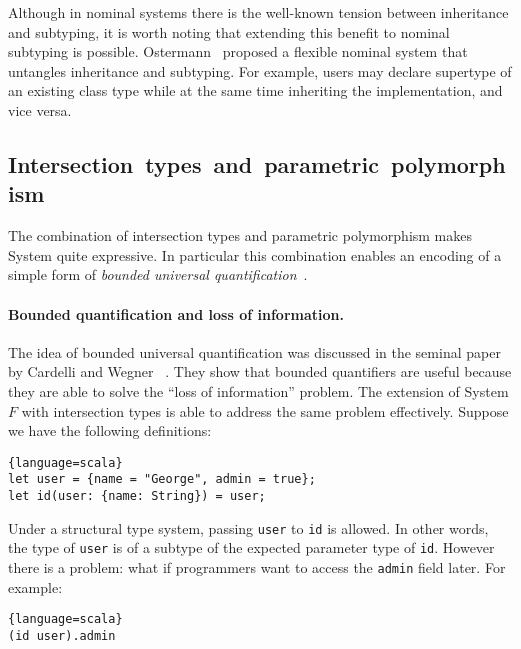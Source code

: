 Although in nominal systems there is the well-known tension between inheritance
and subtyping, it is worth noting that extending this benefit to nominal
subtyping is possible. Ostermann~\cite{ostermann2008nominal} proposed a flexible
nominal system that untangles inheritance and subtyping. For example, users may
declare supertype of an existing class type while at the same time inheriting
the implementation, and vice versa.



\subsection{\hspace{-5pt}Intersection~types~and~parametric~polymorphism}

The combination of intersection types and parametric polymorphism
makes System \name quite expressive. In particular this combination
enables an encoding of a simple form of \emph{bounded universal
  quantification}~\cite{cardelli1985understanding}.


\paragraph{Bounded quantification and loss of information.}
The idea of bounded universal quantification was discussed in the
seminal paper by Cardelli and Wegner
~\cite{cardelli1985understanding}. They show that bounded quantifiers
are useful because they are able to solve the ``loss of information''
problem. The extension of System $ F $ with intersection types is able
to address the same problem effectively. Suppose we have the following
definitions:
\begin{lstlisting}{language=scala}
let user = {name = "George", admin = true};
let id(user: {name: String}) = user;
\end{lstlisting}
Under a structural type system, passing \lstinline{user}
to \lstinline{id} is allowed.
In other words, the type of \lstinline{user}
is of a subtype of the expected parameter type of \lstinline{id}.
However there is a problem: what if programmers
want to access the \texttt{admin} field later. For example:
\begin{lstlisting}{language=scala}
(id user).admin
\end{lstlisting}

